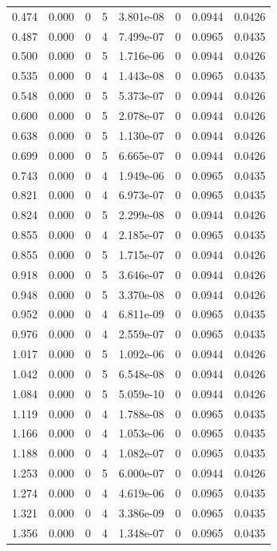 \documentclass[preview]{standalone}
\begin{document}
{{\begin{tabular}{L{1.2cm}C{1.2cm} C{0.3cm}C{0.5cm} C{1.4cm}C{1.4cm} C{1.4cm}C{1.4cm}}
  0.474  &  0.000  & 0     &  5 &  3.801e-08  & 0  & 0.0944 &  0.0426   \\ 
  0.487  &  0.000  & 0     &  4 &  7.499e-07  & 0  & 0.0965 &  0.0435   \\ 
  0.500  &  0.000  & 0     &  5 &  1.716e-06  & 0  & 0.0944 &  0.0426   \\ 
  0.535  &  0.000  & 0     &  4 &  1.443e-08  & 0  & 0.0965 &  0.0435   \\ 
  0.548  &  0.000  & 0     &  5 &  5.373e-07  & 0  & 0.0944 &  0.0426   \\ 
  0.600  &  0.000  & 0     &  5 &  2.078e-07  & 0  & 0.0944 &  0.0426   \\ 
  0.638  &  0.000  & 0     &  5 &  1.130e-07  & 0  & 0.0944 &  0.0426   \\ 
  0.699  &  0.000  & 0     &  5 &  6.665e-07  & 0  & 0.0944 &  0.0426   \\ 
  0.743  &  0.000  & 0     &  4 &  1.949e-06  & 0  & 0.0965 &  0.0435   \\ 
  0.821  &  0.000  & 0     &  4 &  6.973e-07  & 0  & 0.0965 &  0.0435   \\ 
  0.824  &  0.000  & 0     &  5 &  2.299e-08  & 0  & 0.0944 &  0.0426   \\ 
  0.855  &  0.000  & 0     &  4 &  2.185e-07  & 0  & 0.0965 &  0.0435   \\ 
  0.855  &  0.000  & 0     &  5 &  1.715e-07  & 0  & 0.0944 &  0.0426   \\ 
  0.918  &  0.000  & 0     &  5 &  3.646e-07  & 0  & 0.0944 &  0.0426   \\ 
  0.948  &  0.000  & 0     &  5 &  3.370e-08  & 0  & 0.0944 &  0.0426   \\ 
  0.952  &  0.000  & 0     &  4 &  6.811e-09  & 0  & 0.0965 &  0.0435   \\ 
  0.976  &  0.000  & 0     &  4 &  2.559e-07  & 0  & 0.0965 &  0.0435   \\ 
  1.017  &  0.000  & 0     &  5 &  1.092e-06  & 0  & 0.0944 &  0.0426   \\ 
  1.042  &  0.000  & 0     &  5 &  6.548e-08  & 0  & 0.0944 &  0.0426   \\ 
  1.084  &  0.000  & 0     &  5 &  5.059e-10  & 0  & 0.0944 &  0.0426   \\ 
  1.119  &  0.000  & 0     &  4 &  1.788e-08  & 0  & 0.0965 &  0.0435   \\ 
  1.166  &  0.000  & 0     &  4 &  1.053e-06  & 0  & 0.0965 &  0.0435   \\ 
  1.188  &  0.000  & 0     &  4 &  1.082e-07  & 0  & 0.0965 &  0.0435   \\ 
  1.253  &  0.000  & 0     &  5 &  6.000e-07  & 0  & 0.0944 &  0.0426   \\ 
  1.274  &  0.000  & 0     &  4 &  4.619e-06  & 0  & 0.0965 &  0.0435   \\ 
  1.321  &  0.000  & 0     &  4 &  3.386e-09  & 0  & 0.0965 &  0.0435   \\ 
  1.356  &  0.000  & 0     &  4 &  1.348e-07  & 0  & 0.0965 &  0.0435   \\ 
\hline 
\end{tabular} 

}}
\end{document}
